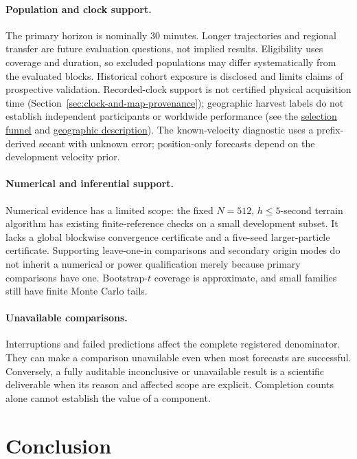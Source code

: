 \documentclass[11pt]{article}
\begin{document}
\paragraph{Population and clock support.}
The primary horizon is nominally 30 minutes. Longer trajectories and regional
transfer are future evaluation questions, not implied results. Eligibility
uses coverage and duration, so excluded populations may differ systematically
from the evaluated blocks. Historical cohort exposure is disclosed and limits
claims of prospective validation. Recorded-clock support is not certified
physical acquisition time (Section~\ref{sec:clock-and-map-provenance});
geographic harvest labels do not establish independent participants or
worldwide performance (see the \hyperref[sec:final-cohort-funnel]{selection funnel}
and \hyperref[sec:final-cohort-geography]{geographic description}).
The known-velocity diagnostic uses a
prefix-derived secant with unknown error; position-only forecasts depend on
the development velocity prior.

\paragraph{Numerical and inferential support.}
Numerical evidence has a limited scope: the fixed \(N=512\), \(h\le5\)-second
terrain algorithm has existing finite-reference checks on a small development
subset. It lacks a global blockwise convergence certificate and a five-seed
larger-particle certificate. Supporting leave-one-in comparisons and secondary
origin modes do not inherit a numerical or power qualification merely because
primary comparisons have one. Bootstrap-\(t\) coverage is approximate, and
small families still have finite Monte Carlo tails.

\paragraph{Unavailable comparisons.}
Interruptions and failed predictions affect the complete registered
denominator. They can make a comparison unavailable even when most forecasts
are successful. Conversely, a fully auditable inconclusive or unavailable
result is a scientific deliverable when its reason and affected scope are
explicit. Completion counts alone cannot establish the value of a component.

\section{Conclusion}
\end{document}
